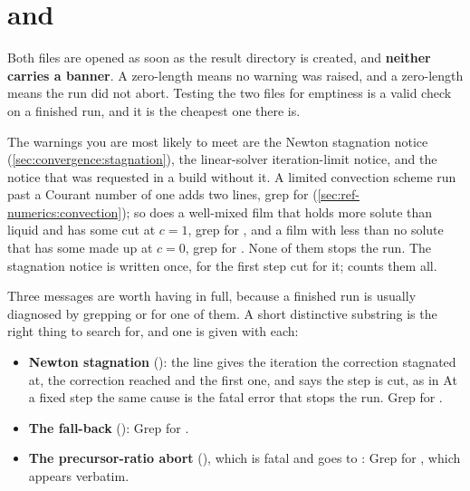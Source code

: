 \section{ and }
\label{sec:output:warnings}

Both files are opened as soon as the result directory is created, and
\textbf{neither carries a banner}. A zero-length  means no warning
was raised, and a zero-length  means the run did not
abort. Testing the two files for emptiness is a valid check on a finished run,
and it is the cheapest one there is.

The warnings you are most likely to meet are the Newton stagnation notice
(\cref{sec:convergence:stagnation}), the linear-solver iteration-limit notice, and
the notice that  was requested in a build without it. A limited
convection scheme run past a Courant number of one adds two lines, grep for
 (\cref{sec:ref-numerics:convection}); so does a
well-mixed film that holds more solute than liquid and has some cut at
$c = 1$, grep for , and a film with less than no solute
that has some made up at $c = 0$, grep for . None of
them stops the run. The stagnation notice is written once, for the first
step cut for it;  counts them all.

\begin{note}
  Three messages are worth having in full, because a finished run is usually
  diagnosed by grepping  or  for one
  of them. A short distinctive substring is the right thing to search for, and
  one is given with each:

  \begin{itemize}
    \item \textbf{Newton stagnation}
      (): the line gives the iteration
      the correction stagnated at, the correction reached and the first one,
      and says the step is cut, as in
       At a fixed step
      the same cause is the fatal error that stops the run. Grep for
      .
    \item \textbf{The  fall-back}
      ():
       Grep for .
    \item \textbf{The precursor-ratio abort}
      (), which is fatal and goes to
      :  Grep for
      , which appears verbatim.
  \end{itemize}
\end{note}

